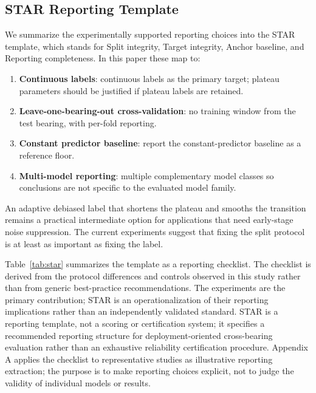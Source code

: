 \documentclass[pdflatex,sn-basic,NameDate]{sn-jnl}
\begin{document}
\subsection{STAR Reporting Template}
We summarize the experimentally supported reporting choices into the STAR template, which stands for Split integrity, Target integrity, Anchor baseline, and Reporting completeness. In this paper these map to:
\begin{enumerate}
    \item \textbf{Continuous labels}: continuous labels as the primary target; plateau parameters should be justified if plateau labels are retained.
    \item \textbf{Leave-one-bearing-out cross-validation}: no training window from the test bearing, with per-fold reporting.
    \item \textbf{Constant predictor baseline}: report the constant-predictor baseline as a reference floor.
    \item \textbf{Multi-model reporting}: multiple complementary model classes so conclusions are not specific to the evaluated model family.
\end{enumerate}
An adaptive debiased label that shortens the plateau and smooths the transition remains a practical intermediate option for applications that need early-stage noise suppression. The current experiments suggest that fixing the split protocol is at least as important as fixing the label.

Table~\ref{tab:star} summarizes the template as a reporting checklist. The checklist is derived from the protocol differences and controls observed in this study rather than from generic best-practice recommendations. The experiments are the primary contribution; STAR is an operationalization of their reporting implications rather than an independently validated standard. STAR is a reporting template, not a scoring or certification system; it specifies a recommended reporting structure for deployment-oriented cross-bearing evaluation rather than an exhaustive reliability certification procedure. Appendix A applies the checklist to representative studies as illustrative reporting extraction; the purpose is to make reporting choices explicit, not to judge the validity of individual models or results.
\end{document}

